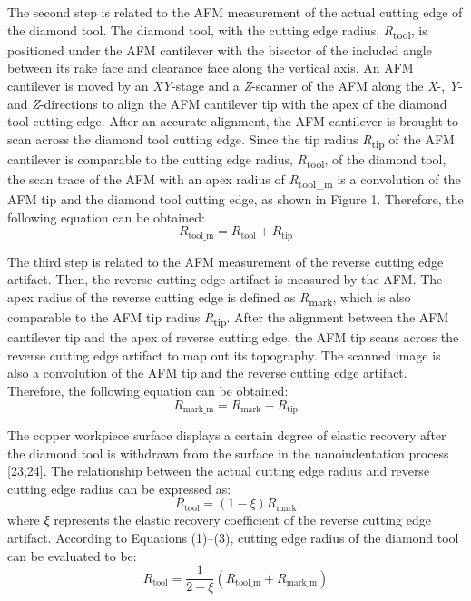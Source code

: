 \documentclass{article}
\newcommand{\R}[1]{\emph{R}\textsubscript{#1}}
\begin{document}
The second step is related to the AFM measurement of the actual cutting edge of the diamond tool. The diamond tool, with the cutting edge radius, \R{tool}, is positioned under the AFM cantilever with the bisector of the included angle between its rake face and clearance face along the vertical axis. An AFM cantilever is moved by an \emph{XY}-stage and a \emph{Z}-scanner of the AFM along the \emph{X}-, \emph{Y}- and \emph{Z}-directions to align the AFM cantilever tip with the apex of the diamond tool cutting edge. After an accurate alignment, the AFM cantilever is brought to scan across the diamond tool cutting edge. Since the tip radius \R{tip} of the AFM cantilever is comparable to the cutting edge radius, \R{tool}, of the diamond tool, the scan trace of the AFM with an apex radius of \R{tool\_m} is a convolution of the AFM tip and the diamond tool cutting edge, as shown in Figure 1. Therefore, the following equation can be obtained:
\begin{equation}
R_\mathrm{tool\_m} = R_\mathrm{tool} + R_\mathrm{tip}
\tag{1}
\end{equation}

The third step is related to the AFM measurement of the reverse cutting edge artifact. Then, the reverse cutting edge artifact is measured by the AFM. The apex radius of the reverse cutting edge is defined as \R{mark}, which is also comparable to the AFM tip radius \R{tip}. After the alignment between the AFM cantilever tip and the apex of reverse cutting edge, the AFM tip scans across the reverse cutting edge artifact to map out its topography. The scanned image is also a convolution of the AFM tip and the reverse cutting edge artifact. Therefore, the following equation can be obtained:
\begin{equation}
R_\mathrm{mark\_m} = R_\mathrm{mark} - R_\mathrm{tip}
\tag{2}
\end{equation}

The copper workpiece surface displays a certain degree of elastic recovery after the diamond tool is withdrawn from the surface in the nanoindentation process [23,24]. The relationship between the actual cutting edge radius and reverse cutting edge radius can be expressed as:
\begin{equation}
R_\mathrm{tool} = (1 - \xi) R_\mathrm{mark}
\tag{3}
\end{equation}
where \emph{ξ} represents the elastic recovery coefficient of the reverse cutting edge artifact. According to Equations (1)–(3), cutting edge radius of the diamond tool can be evaluated to be:
\begin{equation}
R_\mathrm{tool} = \frac{1}{2 - \xi} \left( R_\mathrm{tool\_m} + R_\mathrm{mark\_m} \right)
\tag{4}
\end{equation}
\end{document}
